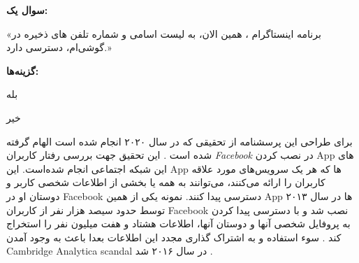 \textbf{سوال یک:}

«برنامه اینستاگرام ، همین الان، به لیست اسامی و شماره تلفن های ذخیره در گوشی‌ام، دسترسی دارد.» 

\textbf{گزینه‌ها:}

بله

خیر

برای طراحی این پرسشنامه از تحقیقی که در سال ۲۰۲۰ انجام شده است الهام گرفته شده است
\!\citep{vanderschyffInformationPrivacyBehavior2020a}.
این تحقیق جهت بررسی رفتار کاربران
\textit{\gls{Facebook}}
در نصب  کردن
\gls{App}
\!‌های
این شبکه اجتماعی انجام شده‌است. این
\gls{App}
\!‌ها
که هر یک سرویس‌های مورد علاقه کاربران را ارائه می‌کنند، می‌توانند به همه یا بخشی از اطلاعات شخصی
کاربر و دوستان او در
\gls{Facebook}
دسترسی پیدا کنند. نمونه یکی از همین
\gls{App}
\!‌ها
در سال ۲۰۱۳ توسط حدود سیصد هزار نفر از کاربران
\gls{Facebook}
نصب شد و با دسترسی پیدا کردن به پروفایل شخصی آنها و دوستان آنها،
اطلاعات هشتاد و هفت میلیون‌ نفر را استخراج کند
\citep{confessoreCambridgeAnalyticaFacebook2018,salinasZuckerbergCambridgeAnalytica,smithThereOpenSecret}.
سوء استفاده و به اشتراک گذاری مجدد این اطلاعات بعدا باعث
به وجود آمدن
\gls{Cambridge Analytica scandal}
در سال ۲۰۱۶ شد
\!\citep{gonzalezGlobalReactionsCambridge2019,grewalSuspendingCambridgeAnalytica2018}.



